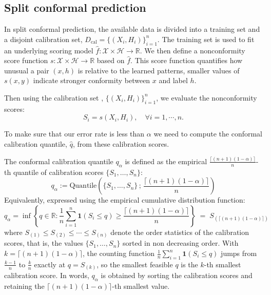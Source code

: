 \subsection{Split conformal prediction} 
\label{sec2.3.2: split conformal}
In split conformal prediction, the available data is divided into a training set and a disjoint calibration 
set, $D_{\text{cal}} = \{(X_i, H_i)\}_{i=1}^n$. The training set is used to fit an underlying scoring model $\hat{f}: 
\mathcal{X} \times \mathcal{H} \to \mathbb{R}$. We then define a nonconformity score function $s: \mathcal{X} \times 
\mathcal{H} \to \mathbb{R}$ based on $\hat{f}$. This score function quantifies how unusual a pair $(x, h)$ is relative 
to the learned patterns, smaller values of $s(x,y)$ indicate stronger conformity between $x$ and label $h$.

Then using the calibration set , $\{(X_i, H_i)\}^n_{i=1}$, we evaluate the nonconformity scores:
$$S_i = s(X_i, H_i), \quad \forall i = 1, \cdots, n.$$

To make sure that our error rate is less than $\alpha$ we need to compute the conformal calibration quantile,
$\hat q$, from these calibration scores.

\begin{definition}
\label{def: conformal calibration quantile}
The conformal calibration quantile $q_{\alpha}$ is defined as the empirical $\frac{\lceil (n+1)(1-\alpha) \rceil}{n}$-th 
quantile of calibration scores $\{S_1, \dots, S_n\}$:
\begin{equation*}
q_{\alpha} := \text{Quantile}\left( \{S_1, \dots, S_n\} \,;\, \frac{\lceil (n+1)(1-\alpha) \rceil}{n} \right)
\end{equation*}
Equivalently, expressed using the empirical cumulative distribution function:
\begin{equation*}
q_{\alpha} = \inf \left\{ q \in \mathbb{R} : \frac{1}{n}\sum_{i=1}^{n} \mathbf{1}(S_i \le q) \ge \frac{\lceil 
(n+1)(1-\alpha) \rceil}{n} \right\} \;=\; S_{\left(\lceil (n+1)(1-\alpha) \rceil\right)}
\end{equation*}
where $S_{(1)} \leq S_{(2)} \leq \cdots \leq S_{(n)}$ denote the order statistics of the calibration scores, that is, the values
$\{S_1, \dots, S_n\}$ sorted in non decreasing order. With $k = \lceil (n+1)(1-\alpha) \rceil$, the counting function 
$\frac{1}{n}\sum_{i=1}^{n} \mathbf{1}(S_i \le q)$ jumps from $\frac{k-1}{n}$ to $\frac{k}{n}$ exactly at $q = S_{(k)}$, so the 
smallest feasible $q$ is the $k$-th smallest calibration score. In words, $q_{\alpha}$ is obtained by sorting the calibration 
scores and retaining the $\lceil (n+1)(1-\alpha) \rceil$-th smallest value.
\end{definition}


